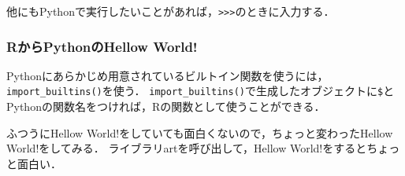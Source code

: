 \documentclass[
]{article}
\newenvironment{Shaded}{\begin{snugshade}}{\end{snugshade}}
\newcommand{\FunctionTok}[1]{\textcolor[rgb]{0.13,0.29,0.53}{\textbf{#1}}}
\newcommand{\NormalTok}[1]{#1}
\newcommand{\OtherTok}[1]{\textcolor[rgb]{0.56,0.35,0.01}{#1}}
\newcommand{\SpecialCharTok}[1]{\textcolor[rgb]{0.81,0.36,0.00}{\textbf{#1}}}
\newcommand{\StringTok}[1]{\textcolor[rgb]{0.31,0.60,0.02}{#1}}
\begin{document}
他にもPythonで実行したいことがあれば，\texttt{\textgreater{}\textgreater{}\textgreater{}}のときに入力する．

\hypertarget{rux304bux3089pythonux306ehellow-world}{%
\subsubsection{RからPythonのHellow World!}\label{rux304bux3089pythonux306ehellow-world}}

Pythonにあらかじめ用意されているビルトイン関数を使うには，\texttt{import\_builtins()}を使う．
\texttt{import\_builtins()}で生成したオブジェクトに\texttt{\$}とPythonの関数名をつければ，Rの関数として使うことができる．

\begin{Shaded}
\end{Shaded}

ふつうにHellow World!をしていても面白くないので，ちょっと変わったHellow World!をしてみる．
ライブラリartを呼び出して，Hellow World!をするとちょっと面白い．
\end{document}
